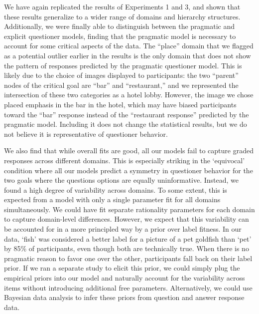 \documentclass[12pt, floatsintext, jou]{apa6}
\begin{document}
We have again replicated the results of Experiments 1 and 3, and shown that these results generalize to a wider range of domains and hierarchy structures. Additionally, we were finally able to distinguish between the pragmatic and explicit questioner models, finding that the pragmatic model is necessary to account for some critical aspects of the data. The ``place'' domain that we flagged as a potential outlier earlier in the results is the only domain that does not show the pattern of responses predicted by the pragmatic questioner model. This is likely due to the choice of images displayed to participants: the two ``parent'' nodes of the critical goal are ``bar'' and ``restaurant,'' and we represented the intersection of these two categories as a hotel lobby. However, the image we chose placed emphasis in the bar in the hotel, which may have biased participants toward the ``bar'' response instead of the ``restaurant response'' predicted by the pragmatic model. Including it does not change the statistical results, but we do not believe it is representative of questioner behavior. 

We also find that while overall fits are good, all our models fail to capture graded responses across different domains. This is especially striking in the `equivocal' condition where all our models predict a symmetry in questioner behavior for the two goals where the questions options are equally uninformative. Instead, we found a high degree of variability across domains. To some extent, this is expected from a model with only a single parameter fit for all domains simultaneously. We could have fit separate rationality parameters for each domain to capture domain-level differences. However, we expect that this variability can be accounted for in a more principled way by a prior over label fitness. In our data, `fish' was considered a better label for a picture of a pet goldfish than `pet' by 85\% of participants, even though both are technically true. When there is no pragmatic reason to favor one over the other, participants fall back on their label prior. If we ran a separate study to elicit this prior, we could simply plug the empirical priors into our model and naturally account for the variability across items without introducing additional free parameters. Alternatively, we could use Bayesian data analysis to infer these priors from question and answer response data. 
\end{document}
